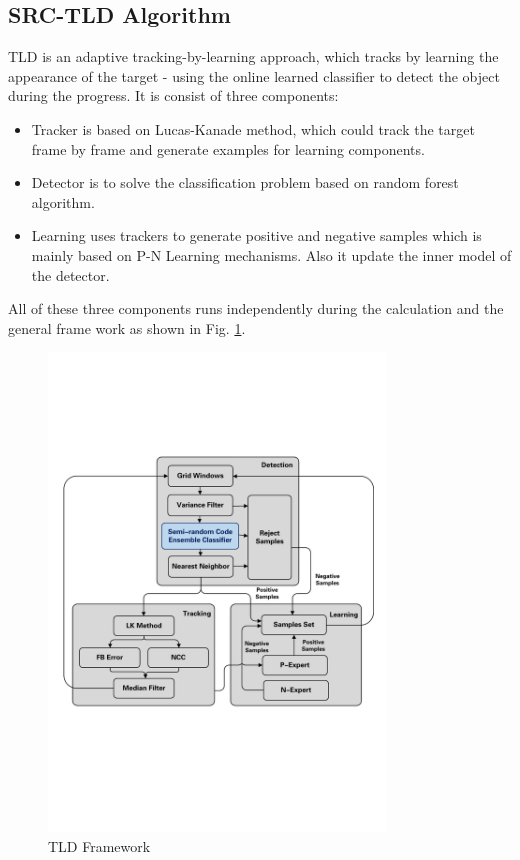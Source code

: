 \subsection{SRC-TLD Algorithm}
TLD\cite{kalal2012tracking} is an adaptive tracking-by-learning approach, which tracks by learning the appearance of the target - using the online learned classifier to detect the object during the progress. It is consist of three components: 
\begin{itemize}
	\item Tracker is based on Lucas-Kanade method, which could track the target frame by frame and generate examples for learning components.
	
	\item Detector is to solve the classification problem based on random forest algorithm.
	
	\item Learning uses trackers to generate positive and negative samples which is mainly based on P-N Learning mechanisms. Also it update the inner model of the detector.
\end{itemize}
All of these three components runs independently during the calculation and the general frame work as shown in Fig. \ref{fig:sci03_tld_framework}.

\begin{figure}[!th]
	\centering
	\includegraphics[width=0.8\textwidth]{Figs/sci03_tld_framework.pdf}	
	\caption{TLD Framework}
	\label{fig:sci03_tld_framework}
\end{figure}


